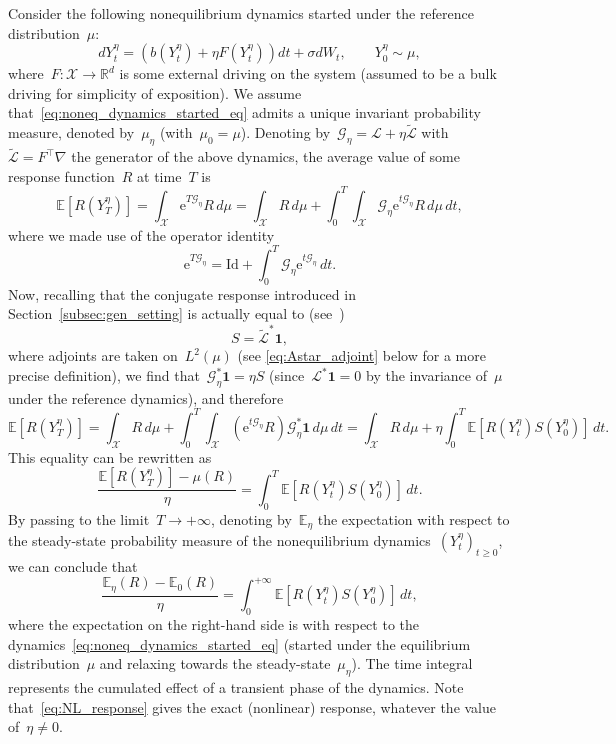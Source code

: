 \documentclass[11pt]{article}
\newcommand{\E}{\mathbb{E}}
\newcommand{\R}{\mathbb{R}}
\newcommand{\e}{\mathrm{e}}
\newcommand{\X}{\mathcal{X}}
\renewcommand{\L}{\mathcal{L}}
\renewcommand{\geq}{\geqslant}
\theoremstyle{definition}
\newcommand{\wcL}{\widetilde{\mathcal{L}}}
\newcommand{\G}{\mathcal{G}}
\newcommand{\Id}{\mathrm{Id}}
\begin{document}
Consider the following nonequilibrium dynamics started under the reference distribution~$\mu$: 
\begin{equation}
  \label{eq:noneq_dynamics_started_eq}
  dY_t^\eta = \left( b(Y_t^\eta) + \eta F(Y_t^\eta) \right) dt + \sigma dW_t, \qquad Y_0^\eta \sim \mu,
\end{equation}
where~$F:\X\to\R^d$ is some external driving on the system (assumed to be a bulk driving for simplicity of exposition). We assume that~\eqref{eq:noneq_dynamics_started_eq} admits a unique invariant probability measure, denoted by~$\mu_\eta$ (with~$\mu_0 = \mu$). Denoting by~$\G_\eta = \L + \eta \wcL$ with~$\wcL = F^\top \nabla$ the generator of the above dynamics, the average value of some response function~$R$ at time~$T$ is
\[
\E\left[R(Y_T^\eta)\right] = \int_\X \e^{T \G_\eta} R \, d\mu = \int_\X R \, d\mu + \int_0^T \int_\X \G_\eta \e^{t \G_\eta}R \, d\mu \, dt,
\]
where we made use of the operator identity 
\[
\e^{T \G_\eta} = \Id + \int_0^T \G_\eta \e^{t \G_\eta} \, dt.
\]
Now, recalling that the conjugate response introduced in Section~\ref{subsec:gen_setting} is actually equal to (see~\cite[Section 5.2.3]{lelievre2016})
\begin{equation}
  \label{eq:conjugate_response}
  S = \wcL^* \mathbf{1},
\end{equation}
where adjoints are taken on~$L^2(\mu)$ (see \eqref{eq:Astar_adjoint} below for a more precise definition), we find that~$\G_\eta^* \mathbf{1} = \eta S$ (since~$\L^* \mathbf{1} = 0$ by the invariance of~$\mu$ under the reference dynamics), and therefore
\[
\E\left[R(Y_T^\eta)\right] = \int_\X R \, d\mu + \int_0^T \int_\X \left(\e^{t \G_\eta}R\right) \G_\eta^* \mathbf{1} \, d\mu \, dt = \int_\X R \, d\mu + \eta \int_0^T \E\left[ R(Y_t^\eta) S(Y_0^\eta)\right] \, dt.
\]
This equality can be rewritten as
\[
\frac{\E\left[R(Y_T^\eta)\right] - \mu(R)}{\eta} = \int_0^T \E\left[ R(Y_t^\eta) S(Y_0^\eta)\right] \, dt.
\]
By passing to the limit~$T \to +\infty$, denoting by~$\E_\eta$ the expectation with respect to the steady-state probability measure of the nonequilibrium dynamics~$(Y_t^\eta)_{t \geq 0}$, we can conclude that
\begin{equation}
  \label{eq:NL_response}
  \frac{\E_\eta(R)-\E_0(R)}{\eta} = \int_0^{+\infty} \E\left[ R(Y_t^\eta) S(Y_0^\eta)\right] \, dt,
\end{equation}
where the expectation on the right-hand side is with respect to the dynamics~\eqref{eq:noneq_dynamics_started_eq} (started under the equilibrium distribution~$\mu$ and relaxing towards the steady-state~$\mu_\eta$). The time integral represents the cumulated effect of a transient phase of the dynamics. Note that~\eqref{eq:NL_response} gives the exact (nonlinear) response, whatever the value of~$\eta \neq 0$.
\end{document}

